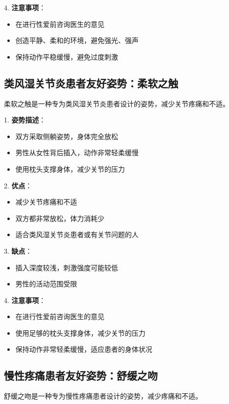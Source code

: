 \documentclass[12pt,UTF8]{ctexbook}
\begin{document}
4. \textbf{注意事项}：
  \begin{itemize}
  \item 在进行性爱前咨询医生的意见
  \item 创造平静、柔和的环境，避免强光、强声
  \item 保持动作平稳缓慢，避免过度刺激
  \end{itemize}

\subsection{类风湿关节炎患者友好姿势：柔软之触}

柔软之触是一种专为类风湿关节炎患者设计的姿势，减少关节疼痛和不适。

1. \textbf{姿势描述}：
  \begin{itemize}
  \item 双方采取侧躺姿势，身体完全放松
  \item 男性从女性背后插入，动作非常轻柔缓慢
  \item 使用枕头支撑身体，减少关节的压力
  \end{itemize}

2. \textbf{优点}：
  \begin{itemize}
  \item 减少关节疼痛和不适
  \item 双方都非常放松，体力消耗少
  \item 适合类风湿关节炎患者或有关节问题的人
  \end{itemize}

3. \textbf{缺点}：
  \begin{itemize}
  \item 插入深度较浅，刺激强度可能较低
  \item 男性的活动范围受限
  \end{itemize}

4. \textbf{注意事项}：
  \begin{itemize}
  \item 在进行性爱前咨询医生的意见
  \item 使用足够的枕头支撑身体，减少关节的压力
  \item 保持动作非常轻柔缓慢，适应患者的身体状况
  \end{itemize}

\subsection{慢性疼痛患者友好姿势：舒缓之吻}

舒缓之吻是一种专为慢性疼痛患者设计的姿势，减少疼痛和不适。
\end{document}
